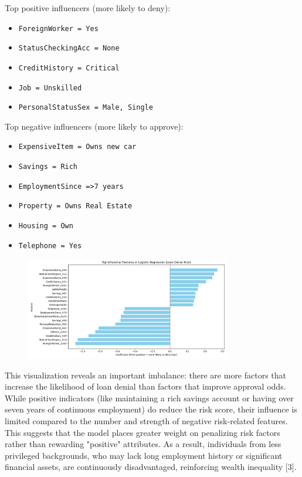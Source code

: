 \documentclass[12pt]{article}
\begin{document}
	Top positive influencers (more likely to deny):
	\begin{itemize}
		\item \texttt{ForeignWorker = Yes}
		\item \texttt{StatusCheckingAcc = None}
		\item \texttt{CreditHistory = Critical}
		\item \texttt{Job = Unskilled}
		\item \texttt{PersonalStatusSex = Male, Single}
	\end{itemize}
	
	Top negative influencers (more likely to approve):
	\begin{itemize}
		\item \texttt{ExpensiveItem = Owns new car}
		\item \texttt{Savings = Rich}
		\item \texttt{EmploymentSince =\textgreater 7 years}
		\item \texttt{Property = Owns Real Estate}
		\item \texttt{Housing = Own}
		\item \texttt{Telephone = Yes}
	\end{itemize}
	
	\begin{figure}[h]
		\centering
		\includegraphics[width=0.8\textwidth]{InfluentialFeatures.png}
		\label{fig:top_features}
	\end{figure}
	
	This visualization reveals an important imbalance: there are more factors that increase the likelihood of loan denial than factors that improve approval odds. While positive indicators (like maintaining a rich savings account or having over seven years of continuous employment) do reduce the risk score, their influence is limited compared to the number and strength of negative risk-related features. This suggests that the model places greater weight on penalizing risk factors rather than rewarding "positive" attributes. As a result, individuals from less privileged backgrounds, who may lack long employment history or significant financial assets, are continuously disadvantaged, reinforcing wealth inequality [3].
	
\end{document}
